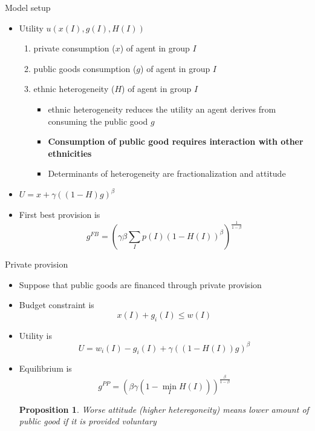 \documentclass[c]{beamer}  %
\newtheorem{proposition}{Proposition}
\begin{document}
    \begin{frame}{Model setup}
        \begin{itemize}
            \item Utility $u(x(I), g(I), H(I) )$
            \begin{enumerate}
                \item private consumption ($x$) of agent in group $I$
                \item public goods consumption ($g$) of agent in group $I$
                \item ethnic heterogeneity ($H$) of agent in group $I$
                \pause
                \begin{itemize}
                    \item ethnic heterogeneity reduces the utility an agent derives from consuming the public good $g$
                    \item \textbf{Consumption of public good requires interaction with other ethnicities}
                    \item Determinants of heterogeneity are fractionalization and attitude
                \end{itemize}
            \end{enumerate}
            \pause
            \item $U = x + \gamma((1 - H) g)^\beta $
            \pause
            \item First best provision is
            \[ g^{FB} = \left( \gamma\beta \sum_{I} p(I) (1-H(I))^{\beta} \right) ^\frac{1}{1 - \beta }  \]
        \end{itemize}
    \end{frame}
    
    \begin{frame}{Private provision}
        \begin{itemize}
            \item Suppose that public goods are financed through private provision
            \item Budget constraint is
            \[ x(I) + g_i(I) \le w(I) \]
            \item Utility is
            \[ U = w_i(I) - g_i(I) + \gamma( (1 - H(I) ) g)^\beta \] 
            \pause
            \item Equilibrium is
            \[ g^{PP} = (\beta\gamma  ( 1 - \min_{I} H(I)))^\frac{\beta}{1 -\beta} \]
            \pause
            \begin{proposition}
            Worse attitude (higher heteregoneity) means lower amount of public good if it is provided voluntary 
            \end{proposition}
        \end{itemize}
    \end{frame}
    
\end{document}

